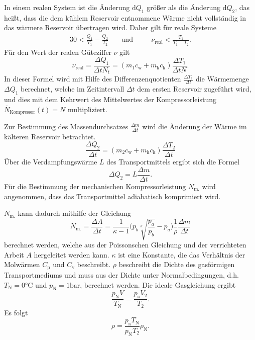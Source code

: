 In einem realen System ist die Änderung $\mathup{d}Q_1$ größer als die Änderung $\mathup{d}Q_2$, das heißt, dass die dem kühlem Reservoir entnommene Wärme nicht vollständig in das wärmere Reservoir übertragen wird.
Daher gilt für reale Systeme
\begin{alignat}{3}
	 0<\frac{Q_1}{T_1}-\frac{Q_2}{T_2} &\quad\text{und} &&\quad\nu_{\text{real}}< \frac{T_1}{T_1-T_2}.
\end{alignat}
Für den Wert der realen Güteziffer $\nu$ gilt
\begin{equation}
	\nu_\mathup{real}=\frac{\Delta{Q_1}}{{\Delta{t}}N_t}=(m_1c_\mathup{w}+m_\mathup{k}c_\mathup{k})\frac{\Delta{T_1}}{{\Delta{t}}N}.
	\label{waermemenge/zeitintervall}
\end{equation}
In dieser Formel wird mit Hilfe des Differenzenquotienten $\frac{\Delta{T_1}}{\Delta{t}}$ die Wärmemenge $\Delta{Q_1}$ berechnet, 
welche im Zeitintervall $\Delta{t}$ dem ersten Reservoir zugeführt wird, 
und dies mit dem Kehrwert des Mittelwertes der Kompressorleistung $\bar{N}_\text{Kompressor}(t) = N$ multipliziert.

Zur Bestimmung des Massendurchsatzes $\frac{\Delta{m}}{\Delta{t}}$ wird die Änderung der Wärme im kälteren Reservoir betrachtet.
\begin{equation}
	\frac{\Delta Q_2}{\Delta t} =(m_2 c_\text{w} + m_\text{k} c_\text{k})\frac{\Delta T_2}{\Delta t}
\label{eq:q2-t-verhaeltnis}
\end{equation}
Über die Verdampfungswärme $L$ des Transportmittels ergibt sich die Formel
\begin{equation}
	\Delta Q_2 =L\frac{\Delta m} {\Delta t}.
\label{eq:verdampfungswaerme}	
\end{equation}
Für die Bestimmung der mechanischen Kompressorleistung $N_\text{m.}$ wird angenommen, dass das Transportmittel adiabatisch komprimiert wird. 

$N_\text{m.}$ kann dadurch mithilfe der Gleichung
\begin{equation}
	N_\mathup{m.}=\frac{\Delta{A}}{\Delta{t}}=\frac{1}{\kappa-1}\biggl(p_b \sqrt[\kappa]{\frac{p_a}{p_b}}-p_a\biggr)\frac{1}{\rho}\frac{\Delta{m}}{\Delta{t}}
\label{eq:kompressorleistung}
\end{equation}
berechnet werden, welche aus der Poissonschen Gleichung und der verrichteten Arbeit $A$ hergeleitet werden kann. 
$\kappa$ ist eine Konstante, die das Verhältnis der Molwärmen $C_\mathup{p}$ und $C_\mathup{v}$ beschreibt. 
$\rho$ beschreibt die Dichte des gasförmigen Transportmediums und muss aus der Dichte unter Normalbedingungen, d.h. $T_\mathup{N}=0\si{\celsius}$ und $p_\mathup{N}=1\si{\bar}$, berechnet werden. 
Die ideale Gasgleichung ergibt
\begin{equation}
	\frac{p_\mathup{N} V}{T_\mathup{N}}=\frac{p_\mathup{a} V_2}{T_2}.
\end{equation}
Es folgt
\begin{equation}
	\rho=\frac{p_\mathup{a}T_\mathup{N}}{p_\mathup{N}T_2}\rho_\mathup{N}.
\label{eq:transportmediumdichte}
\end{equation}
